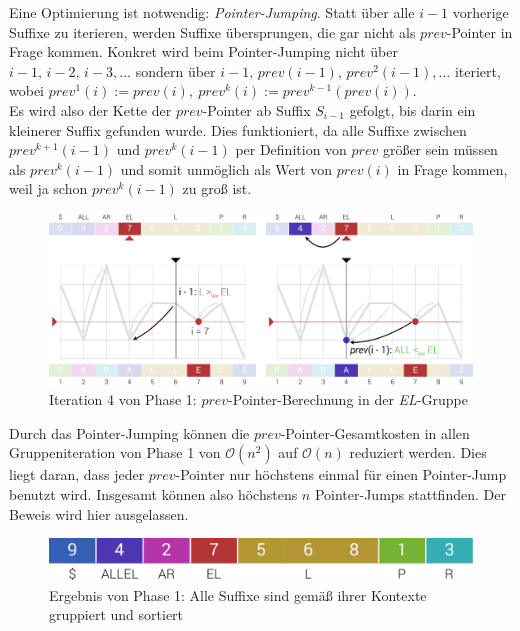 \documentclass[twoside,a4paper,11pt]{article}
\theoremstyle{break}
\begin{document}
Eine Optimierung ist notwendig: \textit{Pointer-Jumping}. Statt über alle $i - 1$ vorherige Suffixe zu iterieren, werden Suffixe übersprungen, die gar nicht als $prev$-Pointer in Frage kommen. Konkret wird beim Pointer-Jumping nicht über $i - 1,\, i - 2,\, i - 3, \dots$ sondern über $i - 1,\, prev(i - 1),\, prev^2(i - 1), \dots$ iteriert, wobei $prev^1(i) := prev(i),\ prev^k(i) := prev^{k - 1}(prev(i))$.\\

Es wird also der Kette der $prev$-Pointer ab Suffix $S_{i - 1}$ gefolgt, bis darin ein kleinerer Suffix gefunden wurde. Dies funktioniert, da alle Suffixe zwischen $prev^{k + 1}(i - 1)$ und $prev^k(i - 1)$ per Definition von $prev$ größer sein müssen als $prev^k(i - 1)$ und somit unmöglich als Wert von $prev(i)$ in Frage kommen, weil ja schon $prev^k(i - 1)$ zu groß ist.

\begin{figure}[h]
	\centering
	\includegraphics[width=\linewidth,bb=0 0 1310 534]{./assets/phase1-EL.pdf}
	\caption{Iteration 4 von Phase 1: $prev$-Pointer-Berechnung in der \textit{EL}-Gruppe}
\label{fig:phase1-EL}
\end{figure}

Durch das Pointer-Jumping können die $prev$-Pointer-Gesamtkosten in allen Gruppeniteration von Phase 1 von $\mathcal{O}(n^2)$ auf $\mathcal{O}(n)$ reduziert werden. Dies liegt daran, dass jeder $prev$-Pointer nur höchstens einmal für einen Pointer-Jump benutzt wird. Insgesamt können also höchstens $n$ Pointer-Jumps stattfinden. Der Beweis wird hier ausgelassen.
\begin{figure}[h]
	\centering
	\includegraphics[width=0.5\linewidth,bb=0 0 640 67]{./assets/phase1Result.pdf}
	\caption{Ergebnis von Phase 1: Alle Suffixe sind gemäß ihrer Kontexte gruppiert und sortiert}
\label{fig:phase1Result}
\end{figure}
\end{document}
